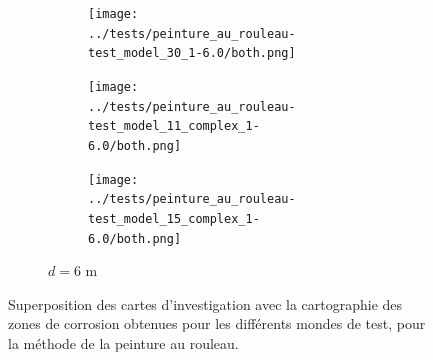 \documentclass[francais,RandD]{rapportPFE}
\begin{document}
\begin{figure}[H]
\begin{subfigure}[t]{\linewidth}
\begin{subfigure}[t]{0.11\linewidth}
					\texttt{[image: ../tests/peinture\_au\_rouleau-test\_model\_30\_1-6.0/both.png]}
				\end{subfigure}
				\hfill
				\begin{subfigure}[t]{0.11\linewidth}
					\texttt{[image: ../tests/peinture\_au\_rouleau-test\_model\_11\_complex\_1-6.0/both.png]}
				\end{subfigure}
				\hfill
				\begin{subfigure}[t]{0.11\linewidth}
					\texttt{[image: ../tests/peinture\_au\_rouleau-test\_model\_15\_complex\_1-6.0/both.png]}
				\end{subfigure}
				\caption{$d = 6$ m}
			\end{subfigure}
			\caption{Superposition des cartes d'investigation avec la cartographie des zones de corrosion obtenues pour les différents mondes de test, pour la méthode de la peinture au rouleau.}
			\label{fig:peinture_au_rouleau_resultats}
		\end{figure}
\end{document}
